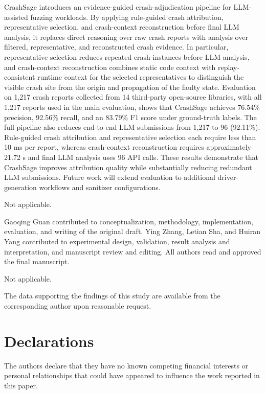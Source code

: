 \documentclass[pdflatex,sn-basic]{sn-jnl}%
\theoremstyle{thmstyleone}%
\theoremstyle{thmstyletwo}%
\theoremstyle{thmstylethree}%
\begin{document}
CrashSage introduces an evidence-guided crash-adjudication pipeline for LLM-assisted fuzzing workloads. By applying rule-guided crash attribution, representative selection, and crash-context reconstruction before final LLM analysis, it replaces direct reasoning over raw crash reports with analysis over filtered, representative, and reconstructed crash evidence. In particular, representative selection reduces repeated crash instances before LLM analysis, and crash-context reconstruction combines static code context with replay-consistent runtime context for the selected representatives to distinguish the visible crash site from the origin and propagation of the faulty state. Evaluation on {\color{blue}1,217} crash reports collected from {\color{blue}14} third-party open-source libraries, with {\color{blue}all 1,217 reports} used in the main evaluation, shows that CrashSage achieves {\color{blue}76.54\%} precision, {\color{blue}92.56\%} recall, and an {\color{blue}83.79\%} F1 score under ground-truth labels. The full pipeline also reduces end-to-end LLM submissions from {\color{blue}1,217 to 96 (92.11\%)}. Rule-guided crash attribution and representative selection each require less than 10 ms per report, whereas crash-context reconstruction requires approximately {\color{blue}21.72 s} and final LLM analysis uses {\color{blue}96 API calls}. These results demonstrate that CrashSage improves attribution quality while substantially reducing redundant LLM submissions. Future work will extend evaluation to additional driver-generation workflows and sanitizer configurations.

\backmatter


Not applicable.


Gaoqing Guan contributed to conceptualization, methodology, implementation, evaluation, and writing of the original draft. Ying Zhang, Letian Sha, and Huiran Yang contributed to experimental design, validation, result analysis and interpretation, and manuscript review and editing. All authors read and approved the final manuscript.


Not applicable.


The data supporting the findings of this study are available from the corresponding author upon reasonable request.

\section*{Declarations}


The authors declare that they have no known competing financial interests or personal relationships that could have appeared to influence the work reported in this paper.


\end{document}
